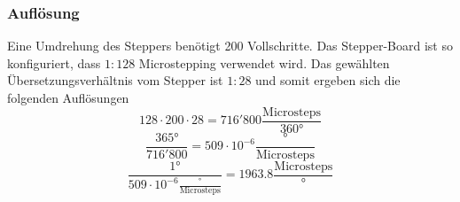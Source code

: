         \subsubsection{Auflösung}
            Eine Umdrehung des Steppers benötigt 200 Vollschritte. Das Stepper-Board ist so konfiguriert, 
            dass $1:128$ Microstepping verwendet wird. Das gewählten Übersetzungsverhältnis vom 
            Stepper ist $1:28$ und somit ergeben sich die folgenden Auflösungen
            \begin{equation}
                128 \cdot 200 \cdot 28 = 716'800\frac{\text{Microsteps}}{360\si{\degree}}
            \end{equation}
            \begin{equation}
                \frac{365\si{\degree}}{716'800} = 509 \cdot 10^{-6}\frac{\si{\degree}}{\text{Microsteps}}
            \end{equation}
            \begin{equation}
               \frac{1\si{\degree}}{509 \cdot 10^{-6}\frac{\si{\degree}}{\text{Microsteps}}} = 1963.8\frac{\text{Microsteps}}{\si{\degree}}
            \end{equation}
            